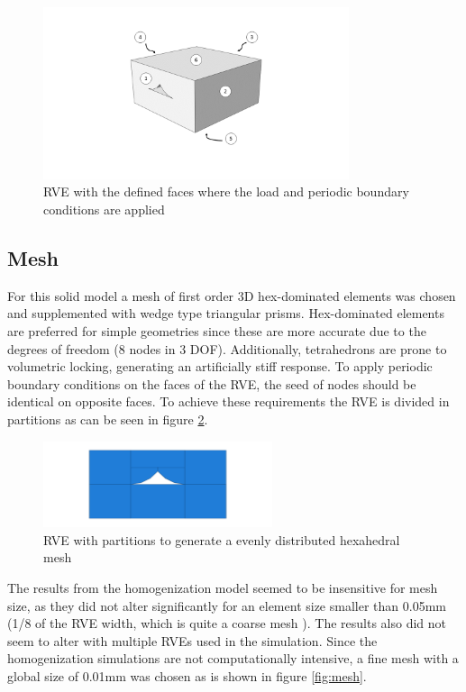 \begin{figure}[htb]
    \centering
    \includegraphics[width=0.80\textwidth]{chapter_6_Elasticmodelling/figures/facesRVE.png}
    \caption{RVE with the defined faces where the load and periodic boundary conditions are applied }
    \label{fig:facesRVE}
\end{figure}

\subsection{Mesh}
For this solid model a mesh of first order 3D hex-dominated elements was chosen and supplemented with wedge type triangular prisms. Hex-dominated elements are preferred for simple geometries since these are more accurate due to the degrees of freedom (8 nodes in 3 DOF). Additionally, tetrahedrons are prone to volumetric locking, generating an artificially stiff response. 
To apply periodic boundary conditions on the faces of the RVE, the seed of nodes should be identical on opposite faces. To achieve these requirements the RVE is divided in partitions as can be seen in figure \ref{fig:partition}.

\begin{figure}[htb]
    \centering
    \includegraphics[width=0.60\textwidth]{chapter_6_Elasticmodelling/figures/partition.png}
    \caption{RVE with partitions to generate a evenly distributed hexahedral mesh}
    \label{fig:partition}
\end{figure}

The results from the homogenization model seemed to be insensitive for mesh size, as they did not alter significantly for an element size smaller than 0.05mm (1/8 of the RVE width, which is quite a coarse mesh ). The results also did not seem to alter with multiple RVEs used in the simulation. Since the homogenization simulations are not computationally intensive, a fine mesh with a global size of 0.01mm was chosen as is shown in figure \ref{fig:mesh}.

